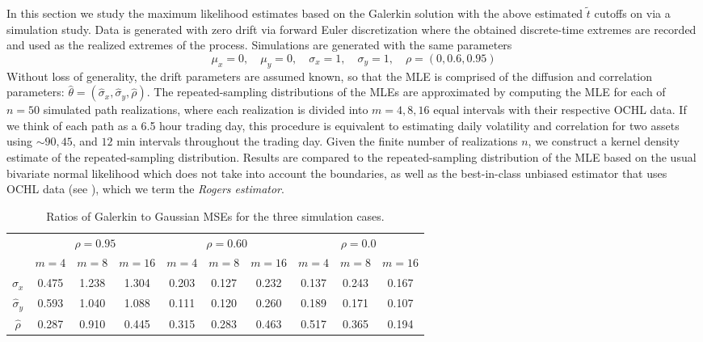In this section we study the maximum likelihood estimates based on the
Galerkin solution with the above estimated $\tilde{t}$ cutoffs on via
a simulation study. Data is generated with zero drift via forward
Euler discretization where the obtained discrete-time extremes are
recorded and used as the realized extremes of the process. Simulations
are generated with the same parameters
\[
  \mu_x = 0,\quad \mu_y  = 0,\quad \sigma_x = 1,\quad \sigma_y = 1,\quad \rho = (0, 0.6, 0.95)
\]
Without loss of generality, the drift parameters are assumed known, so
that the MLE is comprised of the diffusion and correlation parameters:
$\hat{\theta} = (\hat{\sigma}_x, \hat{\sigma}_y, \hat{\rho}).$ The
repeated-sampling distributions of the MLEs are approximated by
computing the MLE for each of $n=50$ simulated path realizations,
where each realization is divided into $m=4,8,16$ equal intervals with
their respective OCHL data. If we think of each path as a 6.5 hour
trading day, this procedure is equivalent to estimating daily
volatility and correlation for two assets using $\sim 90, 45$, and
$12$ min intervals throughout the trading day.  Given the finite
number of realizations $n$, we construct a kernel density estimate of
the repeated-sampling distribution. Results are compared to the
repeated-sampling distribution of the MLE based on the usual bivariate
normal likelihood which does not take into account the boundaries, as
well as the best-in-class unbiased estimator that uses OCHL data (see
\cite{rogers2008estimating}), which we term the \textit{Rogers
  estimator}.


\begin{table}
  \centering
  \begin{tabular}{cccc|ccc|ccc}
    &  \multicolumn{3}{c}{$\rho=0.95$} & \multicolumn{3}{c}{$\rho=0.60$} &  \multicolumn{3}{c}{$\rho=0.0$}\\
    & $m=4$ & $m=8$ & $m=16$ & $m=4$ & $m=8$ & $m=16$ & $m=4$ & $m=8$ & $m=16$ \\
    \hline
    $\hat{\sigma}_x$ & 0.475 & 1.238 & 1.304 & 0.203 & 0.127 & 0.232 & 0.137 & 0.243 & 0.167 \\
    \hline
    $\hat{\sigma}_y$ & 0.593 & 1.040 & 1.088 &  0.111 & 0.120 & 0.260 & 0.189 & 0.171 & 0.107 \\
    \hline
    $\hat{\rho}$ & 0.287 & 0.910 & 0.445 & 0.315 & 0.283 & 0.463 & 0.517 & 0.365 & 0.194
  \end{tabular}
  \caption{Ratios of Galerkin to Gaussian MSEs for the three simulation cases.}
  \label{tab:MSE-ratios}
\end{table}

